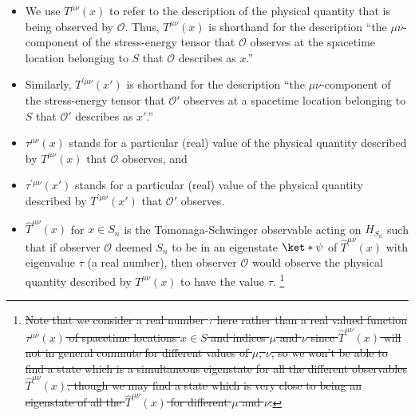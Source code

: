 \documentclass[12pt]{report}
\providecommand{\DIFdel}[1]{{\protect\color{red}\sout{#1}}}                      %
\providecommand{\DIFaddbegin}{} %
\providecommand{\DIFaddend}{} %
\providecommand{\DIFdelbegin}{} %
\providecommand{\DIFdelend}{} %
\begin{document}
\begin{itemize}
\item We use $T^{\mu\nu}(x)$ to refer to the description of the physical quantity that is being observed by $\mathcal{O}$. Thus, $T^{\mu\nu}(x)$ is shorthand for the description ``the $\mu\nu$-component of the stress-energy tensor that $\mathcal{O}$ observes at the spacetime location belonging to $S$ that $\mathcal{O}$ describes as  $x$.'' 
\item Similarly,  $T^{\prime\mu\nu}(x')$ is shorthand for the description ``the $\mu\nu$-component of the stress-energy tensor that $\mathcal{O}'$ observes at a spacetime location  belonging to $S$ that $\mathcal{O}'$ describes as $x'$.'' %
% 
\item $\tau^{\mu\nu}(x)$ stands for a particular (real) value of the physical quantity described by $T^{\mu\nu}(x)$ that $\mathcal{O}$ observes, and 
\item $\tau^{\prime\mu\nu}(x')$ stands for a particular (real) value of the physical quantity described by $T^{\prime\mu\nu}(x')$ that $\mathcal{O}'$ observes.%
\DIFdelbegin %
\DIFdelend \DIFaddbegin {}\DIFaddend %
\item $\hat{T}^{\mu\nu}(x)$ for $x\in S_n$ is the Tomonaga-Schwinger observable acting on $H_{S_n}$ such that if observer $\mathcal{O}$ deemed $S_n$ to be in an eigenstate $\ket*{\psi}$ of $\hat{T}^{\mu\nu}(x)$ with eigenvalue $\tau$ (a real number), then observer $\mathcal{O}$ would observe the physical quantity described by  $T^{\mu\nu}(x)$ to have the value $\tau$.
\DIFdelbegin \footnote{\DIFdel{Note that we consider a real number $\tau$ here rather than a real valued function $\tau^{\mu\nu}(x)$ of spacetime locations $x\in S$ and indices $\mu$ and $\nu$ since $\hat{T}^{\mu\nu}(x)$ will not in general commute for different values of $\mu$, $\nu$, so we won't be able to find a state which is a simultaneous eigenstate for all the different observables $\hat{T}^{\mu\nu}(x)$, though we may find a state which is very close to being an eigenstate of all the  $\hat{T}^{\mu\nu}(x)$ for different $\mu$ and $\nu$.}} 

\end{itemize}
\end{document}
